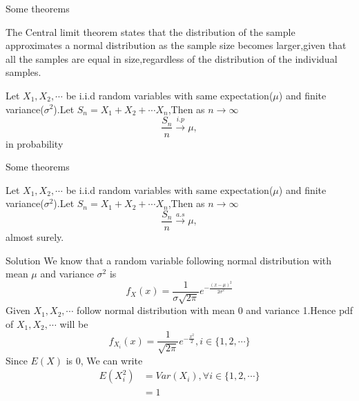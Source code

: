 \documentclass{beamer}
\providecommand{\cbrak}[1]{\ensuremath{\{#1\}}}
\begin{document}
\begin{frame}{Some theorems}
\begin{theorem}
\label{theorem3}
The Central limit theorem states that the distribution of the sample approximates a normal distribution as the sample size becomes larger,given that all the samples are equal in size,regardless of the distribution of the individual samples.
\end{theorem}
\begin{theorem}
\label{theorem}
Let $X_1,X_2,\cdots $ be i.i.d random variables with same expectation($\mu$) and finite variance($\sigma^2$).Let $S_{n}=X_1+X_2+\cdots X_n$,Then as $n \to \infty$
\begin{equation}
    \frac{S_n}{n} \xrightarrow{i.p}  \mu,
\end{equation}
in probability
\end{theorem}
\end{frame}
\begin{frame}{Some theorems}
\begin{theorem}
\label{theorem2}
Let $X_1,X_2,\cdots $ be i.i.d random variables with same expectation($\mu$) and finite variance($\sigma^2$).Let $S_{n}=X_1+X_2+\cdots X_n$,Then as $n \to \infty$
\begin{equation}
    \frac{S_n}{n} \xrightarrow{a.s}  \mu,
\end{equation}
almost surely.
\end{theorem}
\end{frame}
\begin{frame}{Solution}
    We know that a random variable following normal distribution with mean $\mu$ and variance $\sigma^2$ is 
    \begin{equation}
        f_X(x) = \frac{1}{\sigma\sqrt{2\pi}}e^{-\frac{(x-\mu)^2}{2\sigma^2}}
    \end{equation}
    Given $X_1,X_2, \cdots$ follow normal distribution with mean 0 and variance 1.Hence pdf of $X_1,X_2,\cdots$ will be
\begin{equation}
    f_{X_i}(x)=\frac{1}{\sqrt{2\pi}}e^{-\frac{x^2}{2}} ,i \in \cbrak{1,2,\cdots}
\end{equation}
Since $E(X)$ is 0, We can write
\begin{align}
    E(X_i^2)&=Var(X_i),\forall i \in \cbrak{1,2,\cdots}\\
    &=1\label{eq:x2}
\end{align}
\end{frame}
\end{document}
